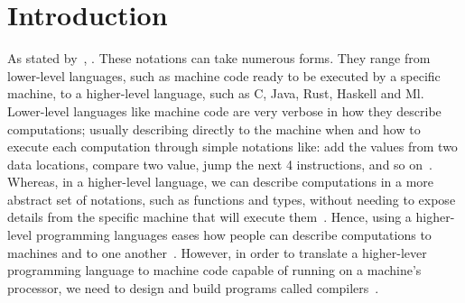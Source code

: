 \documentclass[
  oneside,
  english,
  coorientadorbanca,
  embeddedlogo,
  noabntexcite
]{ufsc-thesis-rn46-2019}
\begin{document}

\tableofcontents*

\textual{}

\chapter{Introduction}\label{chapter:introduction}

As stated by~\textcite{Aho:2006:CPT:1177220}, .
These notations can take numerous forms.
They range from lower-level languages, such as machine code ready to be executed by a specific machine, to a higher-level language, such as C, Java, Rust, Haskell and Ml.
Lower-level languages like machine code are very verbose in how they describe computations; usually describing directly to the machine when and how to execute each computation through simple notations like: add the values from two data locations, compare two value, jump the next 4 instructions, and so on~\cite{Aho:2006:CPT:1177220}.
Whereas, in a higher-level language, we can describe computations in a more abstract set of notations, such as functions and types, without needing to expose details from the specific machine that will execute them~\cite{Aho:2006:CPT:1177220}.
Hence, using a higher-level programming languages eases how people can describe computations to machines and to one another~\cite{Aho:2006:CPT:1177220}.
However, in order to translate a higher-lever programming language to machine code capable of running on a machine's processor, we need to design and build programs called compilers~\cite{Aho:2006:CPT:1177220}.
\end{document}
